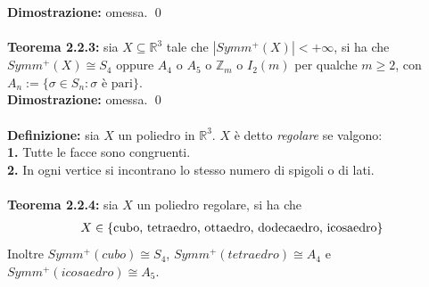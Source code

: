 \documentclass{article}
\begin{document}
\textbf{Dimostrazione:} omessa. \qed \\ \\
\textbf{Teorema 2.2.3:} sia $X \subseteq \mathbb{R}^3$ tale che $|Symm^+(X)| < +\infty$, si ha che $Symm^+(X) \cong S_4$ oppure $A_4$ o $A_5$ o $\mathbb{Z}_m$ o $I_2(m)$ per qualche $m \geq 2$, con $A_n := \{ \sigma \in S_n : \sigma \text{ è pari} \}$. \\

\textbf{Dimostrazione:} omessa. \qed \\ \\
\textbf{Definizione:} sia $X$ un poliedro in $\mathbb{R}^3$. $X$ è detto \textit{regolare} se valgono: \\
\textbf{1.} Tutte le facce sono congruenti. \\
\textbf{2.} In ogni vertice si incontrano lo stesso numero di spigoli o di lati. \\ \\
\textbf{Teorema 2.2.4:} sia $X$ un poliedro regolare, si ha che
\begin{gather}
    X \in \{ \text{cubo, tetraedro, ottaedro, dodecaedro, icosaedro} \} \notag
\end{gather}
Inoltre $Symm^+(cubo) \cong S_4$, $Symm^+(tetraedro) \cong A_4$ e $Symm^+(icosaedro) \cong A_5$. \\
\end{document}
